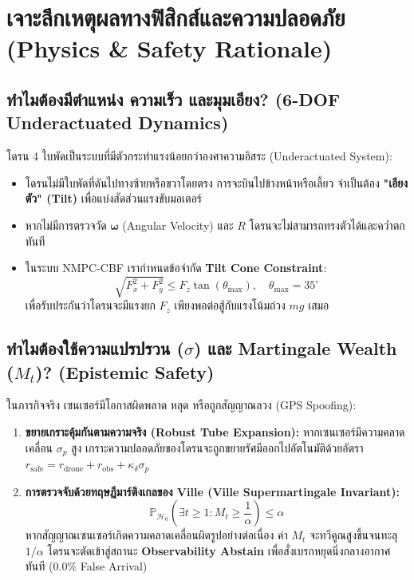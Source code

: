 \documentclass[11pt,a4paper]{article}
\begin{document}
\newpage

\section{เจาะลึกเหตุผลทางฟิสิกส์และความปลอดภัย (Physics \& Safety Rationale)}

\subsection{ทำไมต้องมีตำแหน่ง ความเร็ว และมุมเอียง? (6-DOF Underactuated Dynamics)}
โดรน 4 ใบพัดเป็นระบบที่มีตัวกระทำแรงน้อยกว่าองศาความอิสระ (Underactuated System):
\begin{itemize}[leftmargin=6mm]
    \item โดรนไม่มีใบพัดที่ดันไปทางซ้ายหรือขวาโดยตรง การจะบินไปข้างหน้าหรือเลี้ยว จำเป็นต้อง \textbf{"เอียงตัว" (Tilt)} เพื่อแบ่งสัดส่วนแรงขับมอเตอร์
    \item หากไม่มีการตรวจวัด $\boldsymbol{\omega}$ (Angular Velocity) และ $R$ โดรนจะไม่สามารถทรงตัวได้และคว่ำตกทันที
    \item ในระบบ NMPC-CBF เรากำหนดข้อจำกัด \textbf{Tilt Cone Constraint}:
    \begin{equation}
        \sqrt{F_x^2 + F_y^2} \le F_z \tan(\theta_{\max}), \quad \theta_{\max} = 35^\circ
    \end{equation}
    เพื่อรับประกันว่าโดรนจะมีแรงยก $F_z$ เพียงพอต่อสู้กับแรงโน้มถ่วง $mg$ เสมอ
\end{itemize}

\subsection{ทำไมต้องใช้ความแปรปรวน ($\sigma$) และ Martingale Wealth ($M_t$)? (Epistemic Safety)}
ในภารกิจจริง เซนเซอร์มีโอกาสผิดพลาด หลุด หรือถูกสัญญาณลวง (GPS Spoofing):
\begin{enumerate}[leftmargin=6mm]
    \item \textbf{ขยายเกราะคุ้มกันตามความจริง (Robust Tube Expansion):} หากเซนเซอร์มีความคลาดเคลื่อน $\sigma_p$ สูง เกราะความปลอดภัยของโดรนจะถูกขยายรัศมีออกไปอัตโนมัติด้วยอัตรา $r_{\text{safe}} = r_{\text{drone}} + r_{\text{obs}} + \kappa_\delta \sigma_p$
    \item \textbf{การตรวจจับด้วยทฤษฎีมาร์ติงเกลของ Ville (Ville Supermartingale Invariant):}
    \begin{equation}
        \mathbb{P}_{\mathcal{H}_0}\left(\exists t \ge 1 : M_t \ge \frac{1}{\alpha}\right) \le \alpha
    \end{equation}
    หากสัญญาณเซนเซอร์เกิดความคลาดเคลื่อนผิดรูปอย่างต่อเนื่อง ค่า $M_t$ จะทวีคูณสูงขึ้นจนทะลุ $1/\alpha$ โดรนจะตัดเข้าสู่สถานะ \textbf{Observability Abstain} เพื่อสั่งเบรกหยุดนิ่งกลางอากาศทันที (0.0\% False Arrival)
\end{enumerate}
\end{document}

